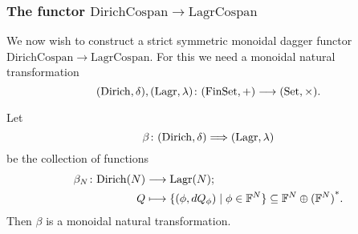 \subsubsection*{The functor $\mathrm{DirichCospan} \to \mathrm{LagrCospan}$}

We now wish to construct a strict symmetric monoidal dagger functor
$\mathrm{DirichCospan} \to \mathrm{LagrCospan}$.  For this we need a monoidal natural transformation 
\[
  (\mathrm{Dirich},\delta), (\mathrm{Lagr},\lambda){\colon} (\mathrm{FinSet},+)
  \longrightarrow (\mathrm{Set},\times).
\]
\begin{proposition}
Let
\[
  \beta{\colon} (\mathrm{Dirich},\delta) \Longrightarrow (\mathrm{Lagr},\lambda)
\]
be the collection of functions
\begin{align*}
  \beta_N{\colon} \mathrm{Dirich}(N) &\longrightarrow \mathrm{Lagr}(N); \\
  Q &\longmapsto \{(\phi,dQ_\phi) \mid \phi \in {\mathbb F}^N\} \subseteq {{\mathbb F}^{N} \oplus {({\mathbb F}^{N})}^\ast}.
\end{align*}
Then $\beta$ is a monoidal natural transformation.
\end{proposition}

